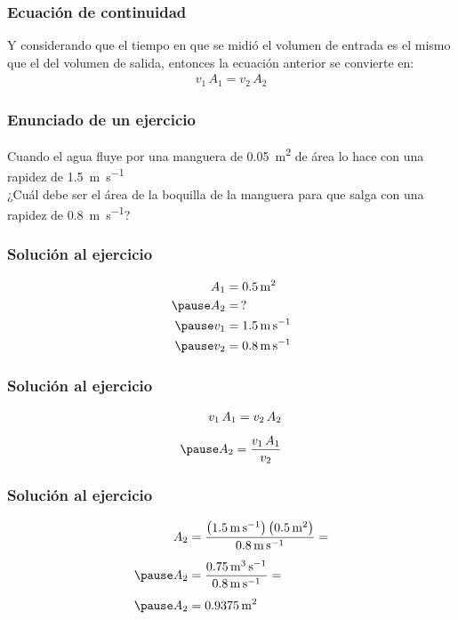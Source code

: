\documentclass[14pt]{beamer}
\begin{document}
\begin{frame}
\frametitle{Ecuación de continuidad}
Y considerando que el tiempo en que se midió el volumen de entrada es el mismo que el del volumen de salida, \pause entonces la ecuación anterior se convierte en:
\pause
\begin{align*}
v_{1} \, A_{1} = v_{2} \, A_{2}
\end{align*}
\end{frame}
\begin{frame}
\frametitle{Enunciado de un ejercicio}
Cuando el agua fluye por una manguera de \SI{0.05}{\square\meter} de área lo hace con una rapidez de \SI{1.5}{\meter\per\second}
\\
\bigskip
\pause
¿Cuál debe ser el área de la boquilla de la manguera para que salga con una rapidez de \SI{0.8}{\meter\per\second}?
\end{frame}
\begin{frame}
\frametitle{Solución al ejercicio}
\pause
\begin{eqnarray*}
\begin{aligned}
A_{1} &= \SI{0.5}{\square\meter} \\ \pause
A_{2} &= \, ? \\ \pause
v_{1} &= \SI{1.5}{\meter\per\second} \\ \pause
v_{2} &= \SI{0.8}{\meter\per\second}  
\end{aligned}
\end{eqnarray*}
\end{frame}
\begin{frame}
\frametitle{Solución al ejercicio}
\pause
\begin{eqnarray*}
\begin{aligned}
v_{1} \, A_{1} = v_{2} \, A_{2} \\[0.5em] \pause
A_{2} = \dfrac{v_{1} \, A_{1}}{v_{2}}
\end{aligned}
\end{eqnarray*}
\end{frame}
\begin{frame}
\frametitle{Solución al ejercicio}
\pause
\begin{eqnarray*}
\begin{aligned}
A_{2} &= \dfrac{\left( \SI{1.5}{\meter\per\second} \right) \left( \SI{0.5}{\square\meter} \right)}{\SI{0.8}{\meter\per\second}} = \\[0.5em] \pause
A_{2} &= \dfrac{\SI{0.75}{\cubic\meter\per\second}}{\SI{0.8}{\meter\per\second}} = \\[0.5em] \pause
A_{2} &= \SI{0.9375}{\square\meter}
\end{aligned}
\end{eqnarray*}    
\end{frame}
\end{document}
